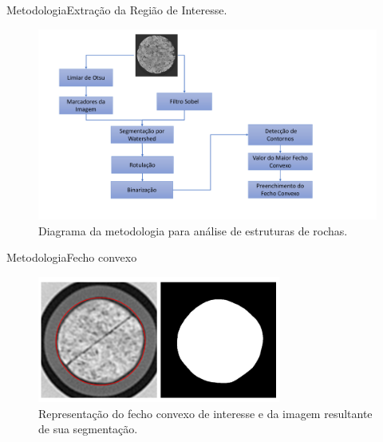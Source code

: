 \documentclass{beamer}
\begin{document}
\begin{frame}{Metodologia}{Extração da Região de Interesse.}
    
     \begin{figure}[!htb]
        \centering
        \includegraphics[width=12cm]{fig/mtd-2.pdf}\\
        \scriptsize{Diagrama da metodologia para análise de estruturas de rochas.}
        \label{fig:metodoMRX}
    \end{figure}
    
\end{frame}

\begin{frame}{Metodologia}{Fecho convexo}
    \begin{figure}[!htb]
        \centering
        \includegraphics[width=8cm]{fig/ct-sample.png}\\
        \scriptsize{Representação do fecho convexo de interesse e da imagem resultante de sua segmentação.}
        \label{fig:metodoMRX}
    \end{figure}
\end{frame}
\end{document}
